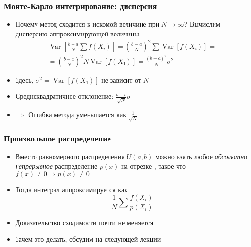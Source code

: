 \documentclass[10pt]{beamer}
\begin{document}
\begin{frame}[fragile]
\frametitle{Монте-Карло интегрирование: дисперсия}
\begin{itemize}
\item Почему метод сходится к искомой величине при \begin{math}N\rightarrow \infty\end{math}? \pause Вычислим дисперсию аппроксимирующей величины
\begin{gather*}
\operatorname{Var}\left[\frac{b-a}{N}\sum f(X_i)\right] = \left(\frac{b-a}{N}\right)^2\sum\operatorname{Var}[f(X_i)] = \\
= \left(\frac{b-a}{N}\right)^2 N\operatorname{Var}[f(X_1)] = \frac{(b-a)^2}{N}\sigma^2
\end{gather*}
\pause
\item Здесь, \begin{math}\sigma^2 = \operatorname{Var}[f(X_1)]\end{math} не зависит от \begin{math}N\end{math}
\pause
\item Среднеквадратичное отклонение: \begin{math}\frac{b-a}{\sqrt N}\sigma\end{math}
\pause
\item \begin{math}\Longrightarrow\end{math} Ошибка метода уменьшается как \begin{math}\frac{1}{\sqrt N}\end{math}
\end{itemize}
\end{frame}

\begin{frame}[fragile]
\frametitle{Произвольное распределение}
\begin{itemize}
\item Вместо равномерного распределения \begin{math}U(a,b)\end{math} можно взять любое \textit{абсолютно непрерывное} распределение \begin{math}p(x)\end{math} на отрезке \begin{math}[a,b]\end{math}, такое что \begin{math}f(x)\neq 0 \Rightarrow p(x)\neq 0\end{math}
\pause
\item Тогда интеграл аппроксимируется как
\begin{equation*}
\frac{1}{N}\sum \frac{f(X_i)}{p(X_i)}
\end{equation*}
\pause
\item Доказательство сходимости почти не меняется
\pause
\item Зачем это делать, обсудим на следующей лекции
\end{itemize}
\end{frame}
\end{document}

